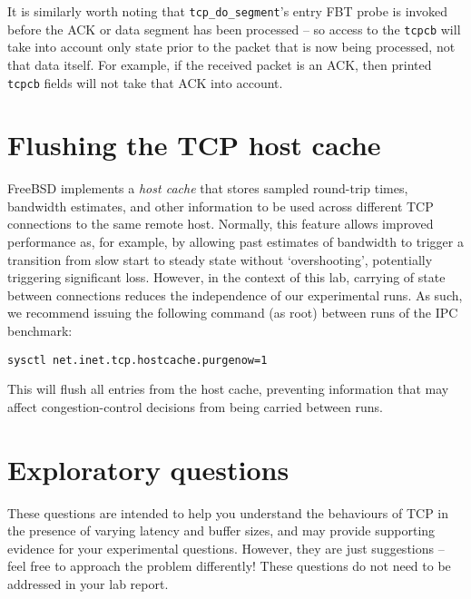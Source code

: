 \documentclass[a4paper,10pt]{article}
\begin{document}
It is similarly worth noting that \texttt{tcp\_do\_segment}'s entry FBT probe
is invoked before the ACK or data segment has been processed -- so access to
the \texttt{tcpcb} will take into account only state prior to the packet that
is now being processed, not that data itself.
For example, if the received packet is an ACK, then printed \texttt{tcpcb}
fields will not take that ACK into account.

\section*{Flushing the TCP host cache}

FreeBSD implements a \textit{host cache} that stores sampled round-trip times,
bandwidth estimates, and other information to be used across different TCP
connections to the same remote host.
Normally, this feature allows improved performance as, for example, by
allowing past estimates of bandwidth to trigger a transition from slow start
to steady state without `overshooting', potentially triggering significant
loss.
However, in the context of this lab, carrying of state between connections
reduces the independence of our experimental runs.
As such, we recommend issuing the following command (as root) between runs of
the IPC benchmark:

\begin{verbatim}
sysctl net.inet.tcp.hostcache.purgenow=1
\end{verbatim}

\noindent
This will flush all entries from the host cache, preventing information that
may affect congestion-control decisions from being carried between runs.

\section*{Exploratory questions}

These questions are intended to help you understand the behaviours of TCP in
the presence of varying latency and buffer sizes, and may provide supporting
evidence for your experimental questions.
However, they are just suggestions -- feel free to approach the problem
differently!
These questions do not need to be addressed in your lab report.
\end{document}
